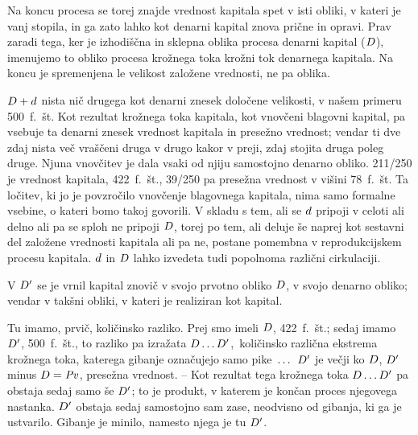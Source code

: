 \documentclass[kapital_02.tex]{subfiles}
\begin{document}
Na koncu procesa se torej znajde vrednost kapitala spet v isti obliki, v kateri je vanj stopila, in ga zato lahko kot denarni kapital znova prične in opravi. Prav zaradi tega, ker je izhodiščna in sklepna oblika procesa denarni kapital (\(D\)), imenujemo to obliko procesa krožnega toka krožni tok denarnega kapitala. Na koncu je spremenjena le velikost založene vrednosti, ne pa oblika.

\(D + d\) nista nič drugega kot denarni znesek določene velikosti, v našem primeru 500~f.~št. Kot rezultat krožnega toka kapitala, kot vnovčeni blagovni kapital, pa vsebuje ta denarni znesek vrednost kapitala in presežno vrednost; vendar ti dve zdaj nista več vraščeni druga v drugo kakor v preji, zdaj stojita druga poleg druge. Njuna vnovčitev je dala vsaki od njiju samostojno denarno obliko. 211/250 je vrednost kapitala, 422~f.~št., 39/250 pa presežna vrednost v višini 78~f.~št. Ta ločitev, ki jo je povzročilo vnovčenje blagovnega kapitala, nima samo formalne vsebine, o kateri bomo takoj govorili. V skladu s tem, ali se \(d\) pripoji v celoti ali delno ali pa se sploh ne pripoji \(D\), torej po tem, ali deluje še naprej kot sestavni del založene vrednosti kapitala ali pa ne, postane pomembna v reprodukcijskem procesu kapitala. \(d\) in \(D\) lahko izvedeta tudi popolnoma različni cirkulaciji.

V \(D'\) se je vrnil kapital znovič v svojo prvotno obliko \(D\), v svojo denarno obliko; vendar v takšni obliki, v kateri je realiziran kot kapital.

Tu imamo, prvič, količinsko razliko. Prej smo imeli \(D\), 422~f.~št.; sedaj imamo \(D'\), 500~f.~št., to razliko pa izražata \(D\dots D'\),\KPEstran\ količinsko različna ekstrema krožnega toka, katerega gibanje označujejo samo pike~\(\dots\) \(D'\) je večji ko \(D\), \(D'\) minus \(D = \mathit{Pv}\), presežna vrednost. -- Kot rezultat tega krožnega toka \(D\dots D'\) pa obstaja sedaj samo še \(D'\); to je produkt, v katerem je končan proces njegovega nastanka. \(D'\) obstaja sedaj samostojno sam zase, neodvisno od gibanja, ki ga je ustvarilo. Gibanje je minilo, namesto njega je tu \(D'\).
\end{document}
